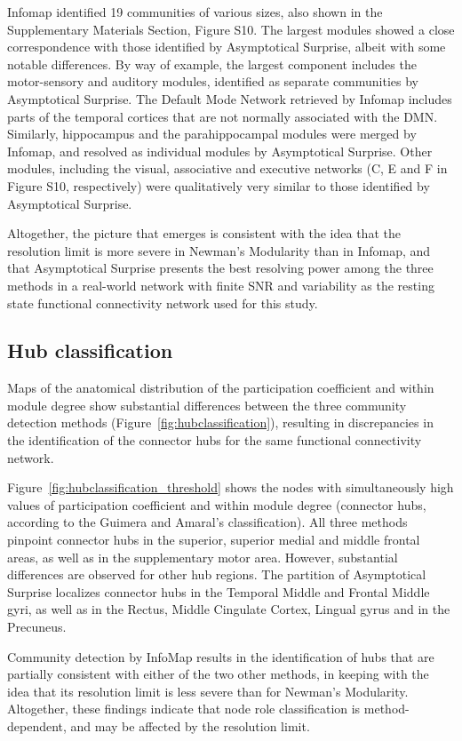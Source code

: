 Infomap identified 19 communities of various sizes, also shown in the Supplementary Materials Section, Figure S10.
The largest modules showed a close correspondence with those identified by Asymptotical Surprise, albeit with some notable differences.
By way of example, the largest component includes the motor-sensory and auditory modules, identified as separate communities by Asymptotical Surprise.
The Default Mode Network retrieved by Infomap includes parts of the temporal cortices that are not normally associated with the DMN.
Similarly, hippocampus and the parahippocampal modules were merged by Infomap, and resolved as individual modules by Asymptotical Surprise.
Other modules, including the visual, associative and executive networks (C, E and F in Figure S10, respectively) were qualitatively very similar to those identified by Asymptotical Surprise.

Altogether, the picture that emerges is consistent with the idea that the resolution limit is more severe in Newman's Modularity than in Infomap, and that Asymptotical Surprise presents the best resolving power among the three methods in a real-world network with finite SNR and variability as the resting state functional connectivity network used for this study.

\subsection{Hub classification}
Maps of the anatomical distribution of the participation coefficient and within module degree show substantial differences between the three community detection methods (Figure~\ref{fig:hubclassification}), resulting in discrepancies in the identification of the connector hubs for the same functional connectivity network.

Figure~\ref{fig:hubclassification_threshold} shows the nodes with simultaneously high values of participation coefficient and within module degree (connector hubs, according to the Guimera and Amaral's classification).
All three methods pinpoint connector hubs in the superior, superior medial and middle frontal areas, as well as in the supplementary motor area.
However, substantial differences are observed for other hub regions. The partition of Asymptotical Surprise localizes connector hubs in the Temporal Middle and Frontal Middle gyri, as well as in the Rectus, Middle Cingulate Cortex, Lingual gyrus and in the Precuneus.

Community detection by InfoMap results in the identification of hubs that are partially consistent with either of the two other methods, in keeping with the idea that its resolution limit is less severe than for Newman's Modularity.
Altogether, these findings indicate that node role classification is method-dependent, and may be affected by the resolution limit.

